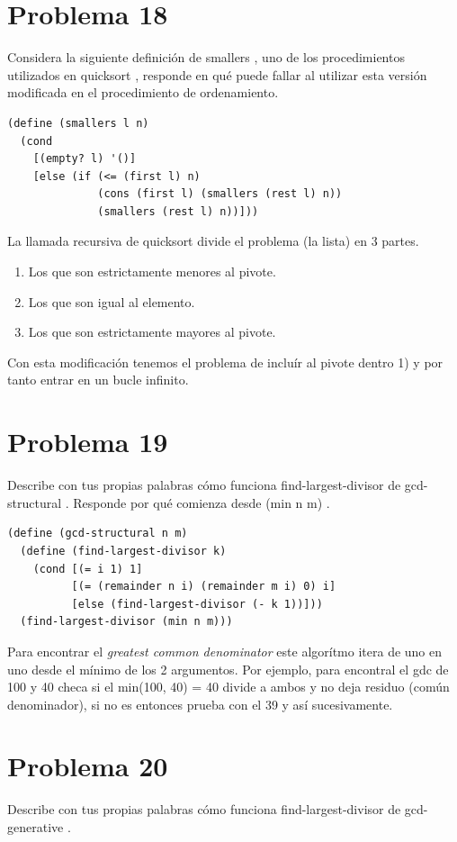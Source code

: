 \documentclass[a4paper,11pt]{article}
\theoremstyle{mytheor}
\begin{document}
\section*{Problema 18}
Considera la siguiente definición de smallers , uno de los procedimientos utilizados
en quicksort , responde en qué puede fallar al utilizar esta versión modificada en el procedimiento
de ordenamiento.

\begin{lstlisting}[title = smallers]
(define (smallers l n)
  (cond
    [(empty? l) '()]
    [else (if (<= (first l) n)
              (cons (first l) (smallers (rest l) n))
              (smallers (rest l) n))]))
\end{lstlisting}

La llamada recursiva de quicksort divide el problema (la lista) en 3 partes.
\begin{enumerate}
\item Los que son estrictamente menores al pivote.
\item Los que son igual al elemento.
\item Los que son estrictamente mayores al pivote.
\end{enumerate}

Con esta modificación tenemos el problema de incluír al pivote dentro 1) y por tanto entrar en un bucle infinito.
\section*{Problema 19}
Describe con tus propias palabras cómo funciona find-largest-divisor de gcd-structural . Responde por qué comienza desde (min n m) .

\begin{lstlisting}[title = gcd-structural]
(define (gcd-structural n m)
  (define (find-largest-divisor k)
    (cond [(= i 1) 1]
          [(= (remainder n i) (remainder m i) 0) i]
          [else (find-largest-divisor (- k 1))]))
  (find-largest-divisor (min n m)))
\end{lstlisting}

Para encontrar el \textit{greatest common denominator} este algorítmo itera de uno en uno desde el mínimo de los 2 argumentos. Por ejemplo, para encontral el gdc de 100 y 40 checa si el min(100, 40) = 40 divide a ambos y no deja residuo (común denominador), si no es entonces prueba con el 39 y así sucesivamente.
\section*{Problema 20}
Describe con tus propias palabras cómo funciona find-largest-divisor de gcd-
generative .
\end{document}
